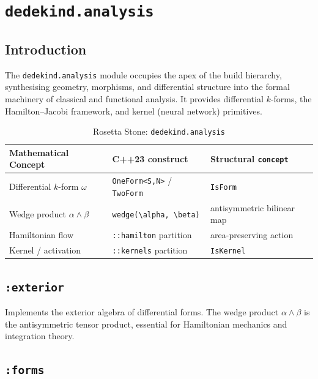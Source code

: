 \documentclass[11pt, a4paper]{report}
\begin{document}
\chapter{\texttt{dedekind.analysis}}
\label{chap:analysis}

\section{Introduction}

The \texttt{dedekind.analysis} module occupies the apex of the build hierarchy, synthesising geometry, morphisms, and differential structure into the formal machinery of classical and functional analysis.
It provides differential $k$-forms, the Hamilton--Jacobi framework, and kernel (neural network) primitives.

\begin{table}[ht]
\centering
\caption{Rosetta Stone: \texttt{dedekind.analysis}}
\label{table:analysis}
\begin{tabular}{lll}
\toprule
\textbf{Mathematical Concept} & \textbf{C++23 construct} & \textbf{Structural \texttt{concept}} \\
\midrule
Differential $k$-form $\omega$ & \texttt{OneForm<S,N>} / \texttt{TwoForm} & \texttt{IsForm} \\
Wedge product $\alpha \wedge \beta$ & \texttt{wedge(\textbackslash{}alpha, \textbackslash{}beta)} & antisymmetric bilinear map \\
Hamiltonian flow & \texttt{::hamilton} partition & area-preserving action \\
Kernel / activation & \texttt{::kernels} partition & \texttt{IsKernel} \\
\bottomrule
\end{tabular}
\end{table}

\section{\texttt{:exterior}}
\label{sec:analysis-exterior}

Implements the exterior algebra of differential forms. The wedge product $\alpha \wedge \beta$ is the antisymmetric tensor product, essential for Hamiltonian mechanics and integration theory.

\section{\texttt{:forms}}
\label{sec:analysis-forms}
\end{document}
